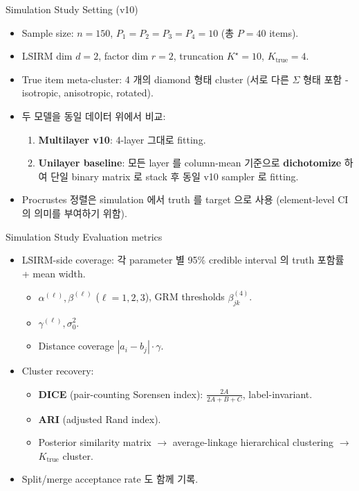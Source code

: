 \documentclass{beamer}
\begin{document}
\begin{frame}{Simulation Study}
{Setting (v10)}

\begin{itemize}
    \item Sample size: $n = 150$, $P_1 = P_2 = P_3 = P_4 = 10$ (총 $P = 40$ items).
    \item LSIRM dim $d = 2$, factor dim $r = 2$, truncation $K^\star = 10$, $K_{\mathrm{true}} = 4$.
    \item True item meta-cluster: 4 개의 diamond 형태 cluster (서로 다른 $\Sigma$ 형태 포함 - isotropic, anisotropic, rotated).
    \item 두 모델을 동일 데이터 위에서 비교:
    \begin{enumerate}
        \item \textbf{Multilayer v10}: 4-layer 그대로 fitting.
        \item \textbf{Unilayer baseline}: 모든 layer 를 column-mean 기준으로 \textbf{dichotomize} 하여 단일 binary matrix 로 stack 후 동일 v10 sampler 로 fitting.
    \end{enumerate}
    \item Procrustes 정렬은 simulation 에서 truth 를 target 으로 사용 (element-level CI 의 의미를 부여하기 위함).
\end{itemize}
\end{frame}

\begin{frame}{Simulation Study}
{Evaluation metrics}

\begin{itemize}
    \item LSIRM-side coverage: 각 parameter 별 95\% credible interval 의 truth 포함률 + mean width.
    \begin{itemize}
        \item $\alpha^{(\ell)}, \beta^{(\ell)}$ ($\ell = 1,2,3$), GRM thresholds $\beta^{(4)}_{jk}$.
        \item $\gamma^{(\ell)}, \sigma_0^2$.
        \item Distance coverage $|a_i - b_j|\cdot \gamma$.
    \end{itemize}
    \item Cluster recovery:
    \begin{itemize}
        \item \textbf{DICE} (pair-counting Sorensen index): $\frac{2A}{2A + B + C}$, label-invariant.
        \item \textbf{ARI} (adjusted Rand index).
        \item Posterior similarity matrix $\to$ average-linkage hierarchical clustering $\to$ $K_{\mathrm{true}}$ cluster.
    \end{itemize}
    \item Split/merge acceptance rate 도 함께 기록.
\end{itemize}
\end{frame}
\end{document}
